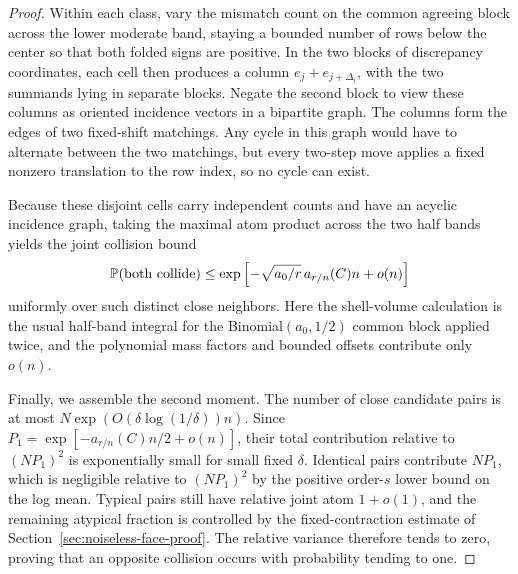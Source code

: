 \begin{proof}
Within each class, vary the mismatch count on the common agreeing block across the lower moderate band, staying a bounded number of rows below the center so that both folded signs are positive. In the two blocks of discrepancy coordinates, each cell then produces a column \(e_j+e_{j+\Delta_i}\), with the two summands lying in separate blocks. Negate the second block to view these columns as oriented incidence vectors in a bipartite graph. The columns form the edges of two fixed-shift matchings. Any cycle in this graph would have to alternate between the two matchings, but every two-step move applies a fixed nonzero translation to the row index, so no cycle can exist.

Because these disjoint cells carry independent counts and have an acyclic incidence graph, taking the maximal atom product across the two half bands yields the joint collision bound
\[
 \mathbb P(\text{both collide})
       \le \exp\left[-\sqrt{a_0/r}\,a_{r/n}(C)n+o(n)\right]
\]
uniformly over such distinct close neighbors. Here the shell-volume calculation is the usual half-band integral for the Binomial\((a_0,1/2)\) common block applied twice, and the polynomial mass factors and bounded offsets contribute only \(o(n)\).

Finally, we assemble the second moment. The number of close candidate pairs is at most \(N\exp(O(\delta\log(1/\delta))n)\). Since \(P_1=\exp[-a_{r/n}(C)n/2+o(n)]\), their total contribution relative to \((NP_1)^2\) is exponentially small for small fixed \(\delta\). Identical pairs contribute \(NP_1\), which is negligible relative to \((NP_1)^2\) by the positive order-\(s\) lower bound on the log mean. Typical pairs still have relative joint atom \(1+o(1)\), and the remaining atypical fraction is controlled by the fixed-contraction estimate of Section~\ref{sec:noiseless-face-proof}. The relative variance therefore tends to zero, proving that an opposite collision occurs with probability tending to one.
\end{proof}
